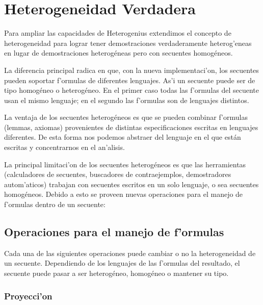 \section{Heterogeneidad Verdadera}
\label{sec:heterogeneidad-verdadera}

Para ampliar las capacidades de Heterogenius extendimos el concepto de heterogeneidad para lograr tener demostraciones verdaderamente heterog'eneas en lugar de demostraciones heterogéneas pero con secuentes homogéneos. 

La diferencia principal radica en que, con la nueva implementaci'on, los secuentes pueden soportar f'ormulas de diferentes lenguajes. As'i un secuente puede ser de tipo homogéneo o heterogéneo. En el primer caso todas las f'ormulas del secuente usan el mismo lenguaje; en el segundo las f'ormulas son de lenguajes distintos.

La ventaja de los secuentes heterogéneos es que se pueden combinar f'ormulas (lemmas, axiomas) provenientes de distintas especificaciones escritas en lenguajes diferentes. De esta forma nos podemos abstraer del lenguaje en el que están escritas y concentrarnos en el an'alisis.

La principal limitaci'on de los secuentes heterogéneos es que las herramientas (calculadores de secuentes, buscadores de contraejemplos, demostradores autom'aticos) trabajan con secuentes escritos en un solo lenguaje, o sea secuentes homogéneos. Debido a esto se proveen nuevas operaciones para el manejo de f'ormulas dentro de un secuente:

\subsection{Operaciones para el manejo de f'ormulas}

Cada una de las siguientes operaciones puede cambiar o no la heterogeneidad de un secuente.  Dependiendo de los lenguajes de las f'ormulas del resultado, el secuente puede pasar a ser heterogéneo, homogéneo o mantener su tipo.

\subsubsection{Proyecci'on}

